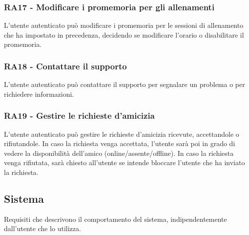 \documentclass[12pt, a4paper]{article}
\begin{document}
\subsubsection*{\hypertarget{RA17}{RA17 - Modificare i promemoria per gli allenamenti}}

L'utente autenticato può modificare i promemoria per le sessioni di allenamento che ha impostato in precedenza, decidendo se modificare l'orario o disabilitare il promemoria.

\subsubsection*{\hypertarget{RA18}{RA18 - Contattare il supporto}}

L'utente autenticato può contattare il supporto per segnalare un problema o per richiedere informazioni.

\subsubsection*{\hypertarget{RA19}{RA19 - Gestire le richieste d'amicizia}}

L'utente autenticato può gestire le richieste d'amicizia ricevute, accettandole o rifiutandole. In caso la richiesta venga accettata, l'utente sarà poi in grado di vedere la disponibilità dell'amico (online/assente/offline). In caso la richiesta venga rifiutata, sarà chiesto all'utente se intende bloccare l'utente che ha inviato la richiesta.

\newpage

\subsection{Sistema}

Requisiti che descrivono il comportamento del sistema, indipendentemente dall'utente che lo utilizza.
\end{document}
